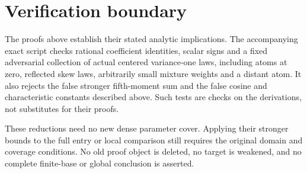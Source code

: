 \documentclass[11pt,a4paper]{article}
\begin{document}
\section{Verification boundary}
The proofs above establish their stated analytic implications. The accompanying
exact script checks rational coefficient identities, scalar signs and a
fixed adversarial collection of actual centered variance-one laws, including
atoms at zero, reflected skew laws, arbitrarily small mixture weights and
a distant atom. It also rejects the false stronger fifth-moment sum and
the false cosine and characteristic constants described above. Such tests
are checks on the derivations, not substitutes for their proofs.

These reductions need no new dense parameter cover. Applying their stronger
bounds to the full entry or local comparison still requires the original
domain and coverage conditions. No old proof object is deleted, no target
is weakened, and no complete finite-base or global conclusion is asserted.
\end{document}
